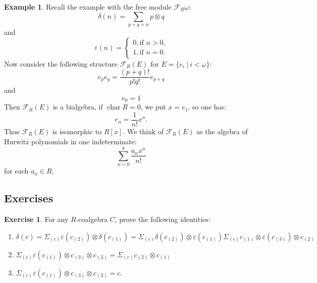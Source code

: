 \documentclass[8pt]{article}
\theoremstyle{definition}
\theoremstyle{definition}
\theoremstyle{definition}
\theoremstyle{definition}
\theoremstyle{definition}
\theoremstyle{definition}
\theoremstyle{definition}
\theoremstyle{definition}
\theoremstyle{definition}
\theoremstyle{definition}
\theoremstyle{definition}
\theoremstyle{definition}
\newtheorem{example}{Example}[section]
\theoremstyle{definition}
\newtheorem{exercise}{Exercise}[section]
\theoremstyle{definition}
\theoremstyle{question}
\begin{document}
\begin{example}
  Recall the example with the free module $\mathcal{F}_R \omega$:
  \[
  \delta(n) = \sum \limits_{p + q = n} p \otimes q
  \]
  and
  \[
  \varepsilon(n) = \begin{cases}
    0, \text{if $n > 0$,} \\
    1, \text{if $n = 0$}.
  \end{cases}
  \]
  Now consider the following structure $\mathcal{F}_R(E)$ for $E = \{ e_i \: | \: i < \omega \}$:
  \[
  e_p e_q = \frac{(p + q)!}{p! q!} e_{p + q}
  \]
  and
  \[
  e_0 = 1
  \]
  Then $\mathcal{F}_R(E)$ is a bialgebra, if $\operatorname{char} R = 0$, we put $x = e_1$, so one has:
  \[
  e_n = \frac{1}{n!} x^n.
  \]
  Thus $\mathcal{F}_R(E)$ is isomorphic to $R[x]$. We think of $\mathcal{F}_R(E)$ as
  the algebra of Hurwitz polynomials in one indeterminate:
  \[
  \sum \limits_{n = 0}^k \frac{a_n x^n}{n!}
  \]
  for each $a_n \in R$.
\end{example}

\subsection{Exercises}

\begin{exercise} For any $R$-coalgebra $C$, prove the following identities:
  \begin{enumerate}
    \item $\delta(c) = \Sigma_{(c)} \varepsilon(c_{(2)}) \otimes \delta(c_{(1)}) = \Sigma_{(c)} \delta(c_{(2)}) \otimes \varepsilon(c_{(1)}) \Sigma_{(c)} c_{(1)} \otimes \varepsilon(c_{(3)}) \otimes c_{(2)}$
    \item $\Sigma_{(c)} \varepsilon(c_{(1)}) \otimes c_{(3)} \otimes c_{(2)} = \Sigma_{(c)} c_{(2)} \otimes c_{(1)}$
    \item $\Sigma_{(c)} \varepsilon(c_{(1)}) \otimes c_{(3)} \otimes c_{(2)} = c$.
  \end{enumerate}
\end{exercise}
\end{document}
